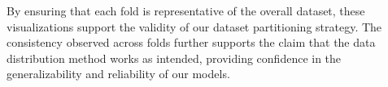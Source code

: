 By ensuring that each fold is representative of the overall dataset, these visualizations support the validity of our dataset partitioning strategy.
The consistency observed across folds further supports the claim that the data distribution method works as intended, providing confidence in the generalizability and reliability of our models.
